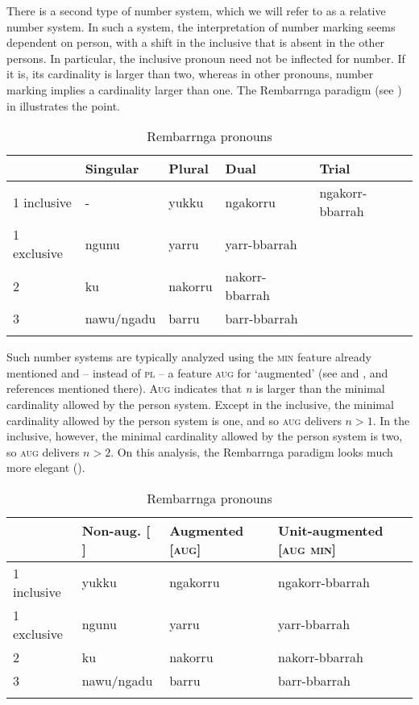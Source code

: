 \documentclass[output=paper]{langsci/langscibook}
\begin{document}
There is a second type of number system, which we will refer to as a relative number system. In such a system, the interpretation of number marking seems dependent on person, with a shift in the inclusive that is absent in the other persons. In particular, the inclusive pronoun need not be inflected for number. If it is, its cardinality is larger than two, whereas in other pronouns, number marking implies a cardinality larger than one. The Rembarrnga paradigm (see \citealt[233]{Cysouw2003}) in  illustrates the point.

\begin{table}\caption{\label{bkm:Ref451950792}Rembarrnga pronouns\label{tab:01:2}}
\begin{tabularx}{\textwidth}{Xllll}
\lsptoprule
& Singular & Plural & Dual & Trial\\
\midrule
1 inclusive & - & yukku & ngakorru & ngakorr-bbarrah\\
1 exclusive & ngunu & yarru & yarr-bbarrah & \\
2 & ku & nakorru & nakorr-bbarrah & \\
3 & nawu\slash ngadu & barru & barr-bbarrah & \\
\lspbottomrule
\end{tabularx}
\end{table}

Such number systems are typically analyzed using the \textsc{min} feature already mentioned and – instead of \textsc{pl} – a feature \textsc{aug} for ‘augmented’ (see \citealt{Bobaljik2008Missing} and \citealt{Cysouw2011}, and references mentioned there). \textsc{Aug} indicates that \textit{n} is larger than the minimal cardinality allowed by the person system. Except in the inclusive, the minimal cardinality allowed by the person system is one, and so \textsc{aug} delivers $n>1$. In the inclusive, however, the minimal cardinality allowed by the person system is two, so \textsc{aug} delivers $n>2$. On this analysis, the Rembarrnga paradigm looks much more elegant ().

\begin{table}
\caption{\label{bkm:Ref328732397}\label{bkm:Ref295309335}Rembarrnga pronouns\label{tab:01:3}}
\begin{tabularx}{\textwidth}{Xlll}
\lsptoprule
& Non-aug. [ ] & Augmented [\textsc{aug}] & Unit-augmented [\textsc{aug} \textsc{min}]\\
\midrule
 1 inclusive & yukku & ngakorru & ngakorr-bbarrah\\
 1 exclusive & ngunu & yarru & yarr-bbarrah\\
 2 & ku & nakorru & nakorr-bbarrah\\
 3 & nawu\slash ngadu & barru & barr-bbarrah\\
\lspbottomrule
\end{tabularx}
\end{table}
\end{document}

